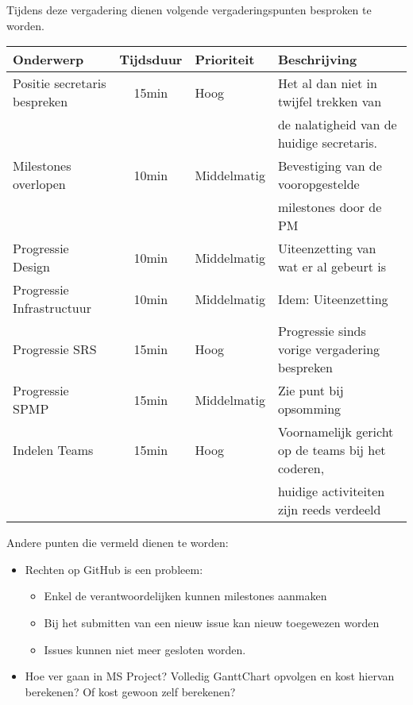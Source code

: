 Tijdens deze vergadering dienen volgende vergaderingspunten besproken te worden.
\begin{table} [H]
	\centering
	\begin{tabular} {l|cll}
		\textbf{Onderwerp} & \textbf{Tijdsduur} & \textbf{Prioriteit} & \textbf{Beschrijving} \\ %
		\hline
		Positie secretaris bespreken & 15min & Hoog & Het al dan niet in twijfel trekken van \\
					& & & de nalatigheid van de huidige secretaris. \\
		Milestones overlopen & 10min & Middelmatig & Bevestiging van de vooropgestelde \\
						& & & milestones door de PM \\
		Progressie Design & 10min & Middelmatig & Uiteenzetting van wat er al gebeurt is \\
		Progressie Infrastructuur & 10min & Middelmatig & Idem: Uiteenzetting \\
		Progressie SRS & 15min & Hoog & Progressie sinds vorige vergadering bespreken \\
		Progressie SPMP & 15min & Middelmatig & Zie punt bij opsomming \\
		Indelen Teams & 15min & Hoog & Voornamelijk gericht op de teams bij het coderen, \\
		 			& & & huidige activiteiten zijn reeds verdeeld \\
	\end{tabular}
\end{table}

Andere punten die vermeld dienen te worden:

\begin{itemize}
	\item
	{
		Rechten op GitHub is een probleem:
		\begin{itemize}
			\item Enkel de verantwoordelijken kunnen milestones aanmaken
			\item Bij het submitten van een nieuw issue kan nieuw toegewezen worden
			\item Issues kunnen niet meer gesloten worden.
		\end{itemize}	
	}
	\item
	{
		Hoe ver gaan in MS Project? Volledig GanttChart opvolgen en kost hiervan berekenen? Of kost gewoon zelf berekenen?
	}
\end{itemize}

